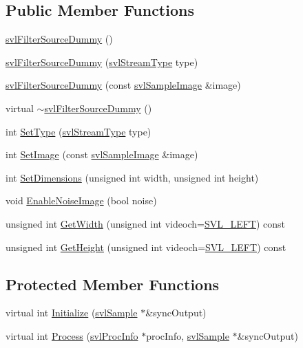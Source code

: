 \subsection*{Public Member Functions}
\begin{DoxyCompactItemize}
\item 
\hyperlink{classsvl_filter_source_dummy_a11e058fdc93020c012e337ccf294d321}{svl\-Filter\-Source\-Dummy} ()
\item 
\hyperlink{classsvl_filter_source_dummy_abf72e1d11e496e7da798ed1a4a165d47}{svl\-Filter\-Source\-Dummy} (\hyperlink{svl_definitions_8h_aa00696d338a58db361335a01fd11e122}{svl\-Stream\-Type} type)
\item 
\hyperlink{classsvl_filter_source_dummy_a77dba4b35b700f31e7f68d8394d9c265}{svl\-Filter\-Source\-Dummy} (const \hyperlink{classsvl_sample_image}{svl\-Sample\-Image} \&image)
\item 
virtual \hyperlink{classsvl_filter_source_dummy_aed008e8a627fe2926024e79da4642b11}{$\sim$svl\-Filter\-Source\-Dummy} ()
\item 
int \hyperlink{classsvl_filter_source_dummy_ab24ce2dea1b0c224db443e39efbad990}{Set\-Type} (\hyperlink{svl_definitions_8h_aa00696d338a58db361335a01fd11e122}{svl\-Stream\-Type} type)
\item 
int \hyperlink{classsvl_filter_source_dummy_ab1067ded15081294b7ed9f647e382090}{Set\-Image} (const \hyperlink{classsvl_sample_image}{svl\-Sample\-Image} \&image)
\item 
int \hyperlink{classsvl_filter_source_dummy_a15dbb9f869bfc8af55a511d23ceb9b70}{Set\-Dimensions} (unsigned int width, unsigned int height)
\item 
void \hyperlink{classsvl_filter_source_dummy_a162a0ea899d8a72bdfeddd3cb5665d6e}{Enable\-Noise\-Image} (bool noise)
\item 
unsigned int \hyperlink{classsvl_filter_source_dummy_a4299d59d573323dd0500bb1fd0e983d5}{Get\-Width} (unsigned int videoch=\hyperlink{svl_definitions_8h_ab9fec7615f19c8df2919eebcab0b187f}{S\-V\-L\-\_\-\-L\-E\-F\-T}) const 
\item 
unsigned int \hyperlink{classsvl_filter_source_dummy_afc465b16cb81c66305c4b534f9c78d2f}{Get\-Height} (unsigned int videoch=\hyperlink{svl_definitions_8h_ab9fec7615f19c8df2919eebcab0b187f}{S\-V\-L\-\_\-\-L\-E\-F\-T}) const 
\end{DoxyCompactItemize}
\subsection*{Protected Member Functions}
\begin{DoxyCompactItemize}
\item 
virtual int \hyperlink{classsvl_filter_source_dummy_a38f36ee210331e0e1ce3cca9b845bb56}{Initialize} (\hyperlink{classsvl_sample}{svl\-Sample} $\ast$\&sync\-Output)
\item 
virtual int \hyperlink{classsvl_filter_source_dummy_afcb9927324723b79a86d695e788ffb4c}{Process} (\hyperlink{structsvl_proc_info}{svl\-Proc\-Info} $\ast$proc\-Info, \hyperlink{classsvl_sample}{svl\-Sample} $\ast$\&sync\-Output)
\end{DoxyCompactItemize}
